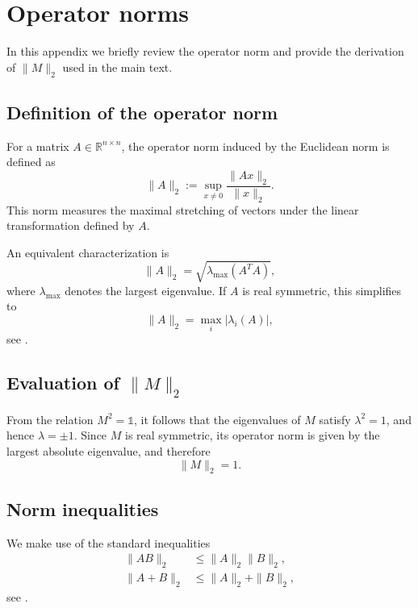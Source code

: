 \documentclass[%
 reprint,
 amsmath,amssymb,
 aps,
twocolumn
]{revtex4-2}
\begin{document}
\section{Operator norms}

In this appendix we briefly review the operator norm and provide the derivation of $\|M\|_2$ used in the main text.

\subsection{Definition of the operator norm}

For a matrix $A \in \mathbb{R}^{n \times n}$, the operator norm induced by the Euclidean norm is defined as
\begin{equation}
\|A\|_2 := \sup_{x \neq 0} \frac{\|Ax\|_2}{\|x\|_2}.
\end{equation}
This norm measures the maximal stretching of vectors under the linear transformation defined by $A$.

An equivalent characterization is
\begin{equation}
\|A\|_2 = \sqrt{\lambda_{\max}(A^T A)},
\end{equation}
where $\lambda_{\max}$ denotes the largest eigenvalue. If $A$ is real symmetric, this simplifies to
\begin{equation}
\|A\|_2 = \max_i |\lambda_i(A)|,
\end{equation}
see \cite{GilbertIntroductionToLinearAlgebra2016}.

\subsection{Evaluation of $\|M\|_2$}

From the relation $M^2 = \mathbb{1}$, it follows that the eigenvalues of $M$ satisfy $\lambda^2 = 1$, and hence $\lambda = \pm 1$. Since $M$ is real symmetric, its operator norm is given by the largest absolute eigenvalue, and therefore
\begin{equation}
\|M\|_2 = 1.
\end{equation}

\subsection{Norm inequalities}

We make use of the standard inequalities
\begin{align}
\|AB\|_2 &\le \|A\|_2 \|B\|_2, \\
\|A + B\|_2 &\le \|A\|_2 + \|B\|_2,
\end{align}
see \cite{GilbertIntroductionToLinearAlgebra2016}.
\end{document}
